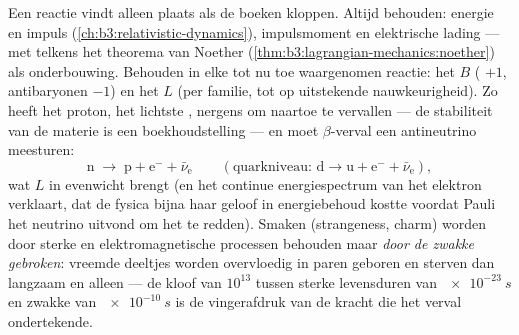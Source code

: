 \begin{proposition}\label{prop:b3:particle-physics:conservation}
Een reactie vindt alleen plaats als de boeken kloppen. Altijd
behouden: energie en impuls
(\cref{ch:b3:relativistic-dynamics}), impulsmoment en
elektrische lading --- met telkens het theorema van Noether
(\cref{thm:b3:lagrangian-mechanics:noether}) als onderbouwing.
Behouden in elke tot nu toe waargenomen reactie: het \emph{}
$B$ ( $+1$, antibaryonen $-1$) en het \emph{}
$L$ (per familie, tot op uitstekende nauwkeurigheid). Zo heeft het proton, het
lichtste , nergens om naartoe te vervallen --- de stabiliteit van de materie is
een boekhoudstelling --- en moet $\beta$-verval een
antineutrino meesturen:
\[
\text{n} \;\to\; \text{p} + \text{e}^- + \bar\nu_{\text{e}}
\qquad (\text{quarkniveau: } \text{d} \to \text{u} +
\text{e}^- + \bar\nu_{\text{e}}) ,
\]
wat $L$ in evenwicht brengt (en het continue energiespectrum van het elektron
verklaart, dat de fysica bijna haar geloof in energiebehoud
kostte voordat Pauli het neutrino uitvond om het te redden).
Smaken (strangeness, charm) worden door sterke en
elektromagnetische processen behouden maar \emph{door de zwakke gebroken}: vreemde
deeltjes worden overvloedig in paren geboren en sterven dan langzaam en alleen
--- de kloof van $10^{13}$ tussen sterke levensduren van $\qty{e-23}{s}$
en zwakke van $\qty{e-10}{s}$ is de vingerafdruk van de kracht die
het verval ondertekende.
\end{proposition}
\admitted

